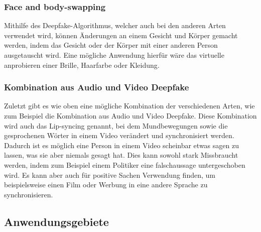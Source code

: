 \subsubsection{Face and body-swapping}
Mithilfe des Deepfake-Algorithmus, welcher auch bei den anderen Arten verwendet wird, können Änderungen an einem Gesicht und Körper gemacht werden, indem das Gesicht oder der Körper mit einer anderen Person ausgetauscht wird. Eine mögliche Anwendung hierfür wäre das virtuelle anprobieren einer Brille, Haarfarbe oder Kleidung.\cite{ResearchGate}

\subsubsection{Kombination aus Audio und Video Deepfake}
Zuletzt gibt es wie oben eine mögliche Kombination der verschiedenen Arten, wie zum Beispiel die Kombination aus Audio und Video Deepfake.
Diese Kombination wird auch das Lip-syncing genannt, bei dem Mundbewegungen sowie die gesprochenen Wörter in einem Video verändert und synchronisiert werden.
Dadurch ist es möglich eine Person in einem Video scheinbar etwas sagen zu lassen, was sie aber niemals gesagt hat. Dies kann sowohl stark Missbraucht werden, indem zum Beispiel einem Politiker eine falschaussage untergeschoben wird.
Es kann aber auch für positive Sachen Verwendung finden, um beispielsweise einen Film oder Werbung in eine andere Sprache zu synchronisieren.\cite{ResearchGate}

\subsection{Anwendungsgebiete}
